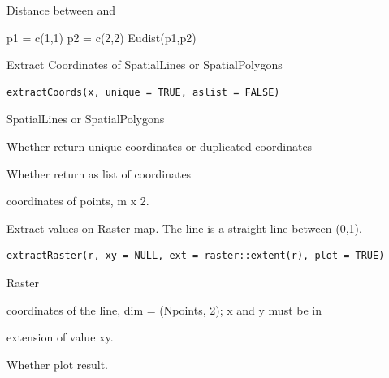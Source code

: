 \documentclass[a4paper]{book}
\begin{document}
%
\begin{Value}
Distance between  and 
\end{Value}
%
\begin{Examples}
\begin{ExampleCode}
p1 = c(1,1)
p2 = c(2,2)
Eudist(p1,p2)
\end{ExampleCode}
\end{Examples}
%
\begin{Description}\relax
Extract Coordinates of SpatialLines or SpatialPolygons
\end{Description}
%
\begin{Usage}
\begin{verbatim}
extractCoords(x, unique = TRUE, aslist = FALSE)
\end{verbatim}
\end{Usage}
%
\begin{Arguments}
\begin{ldescription}
\item[\code{x}] SpatialLines or SpatialPolygons

\item[\code{unique}] Whether return unique coordinates or duplicated coordinates

\item[\code{aslist}] Whether return as list of coordinates
\end{ldescription}
\end{Arguments}
%
\begin{Value}
coordinates of points, m x 2.
\end{Value}
%
\begin{Description}\relax
Extract values on Raster map. The line is a straight line between (0,1).
\end{Description}
%
\begin{Usage}
\begin{verbatim}
extractRaster(r, xy = NULL, ext = raster::extent(r), plot = TRUE)
\end{verbatim}
\end{Usage}
%
\begin{Arguments}
\begin{ldescription}
\item[\code{r}] Raster

\item[\code{xy}] coordinates of the line, dim = (Npoints, 2); x and y must be in 

\item[\code{ext}] extension of value xy.

\item[\code{plot}] Whether plot result.
\end{ldescription}
\end{Arguments}
\end{document}
